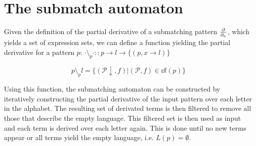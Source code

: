 \section{The submatch automaton}
\label{nfa}

Given the definition of the partial derivative of a submatching pattern $\frac{\partial}{\partial_{a}}$,
which yields a set of expression sets, we can define a function yielding the
partial derivative for a pattern $p$: $\cdot \setminus_p \cdot :: p \to l \to
\{(p, x \to l)\}$

\begin{defn}
   \[p \setminus_p l = \{ (\mathcal{P}\downarrow, f) | (\mathcal{P}, f) \in \dd{l}(p) \}\]
\end{defn}

Using this function, the submatching automaton can be constructed by
iteratively constructing the partial derivative of the input pattern over each
letter in the alphabet. The resulting set of derivated terms is then filtered to
remove all those that describe the empty language. This filtered set is then
used as input and each term is derived over each letter again. This is done
until no new terms appear or all terms yield the empty language, i.e. $L(p) =
\emptyset$.

